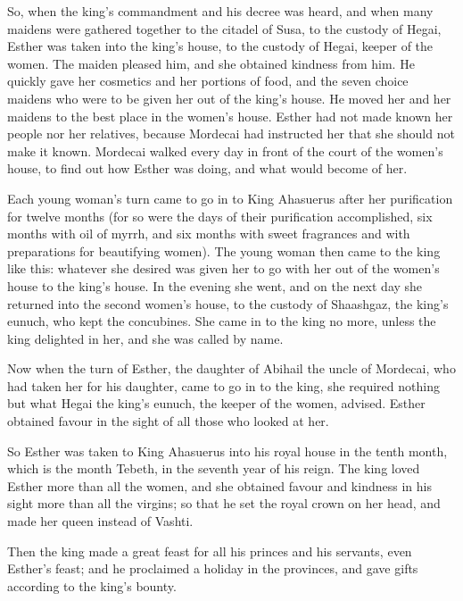 So, when the king's commandment and his decree was heard,
and when many maidens were gathered together to the citadel of Susa, to
the custody of Hegai, Esther was taken into the king's house, to the
custody of Hegai, keeper of the women.  The maiden pleased
him, and she obtained kindness from him. He quickly gave her cosmetics
and her portions of food, and the seven choice maidens who were to be
given her out of the king's house. He moved her and her maidens to the
best place in the women's house.  Esther had not made known
her people nor her relatives, because Mordecai had instructed her that
she should not make it known.  Mordecai walked every day in
front of the court of the women's house, to find out how Esther was
doing, and what would become of her.

 Each young woman's turn came to go in to King Ahasuerus
after her purification for twelve months (for so were the days of their
purification accomplished, six months with oil of myrrh, and six months
with sweet fragrances and with preparations for beautifying women).
 The young woman then came to the king like this: whatever
she desired was given her to go with her out of the women's house to the
king's house.  In the evening she went, and on the next day
she returned into the second women's house, to the custody of Shaashgaz,
the king's eunuch, who kept the concubines. She came in to the king no
more, unless the king delighted in her, and she was called by name.

 Now when the turn of Esther, the daughter of Abihail the
uncle of Mordecai, who had taken her for his daughter, came to go in to
the king, she required nothing but what Hegai the king's eunuch, the
keeper of the women, advised. Esther obtained favour in the sight of all
those who looked at her.

 So Esther was taken to King Ahasuerus into his royal house
in the tenth month, which is the month Tebeth, in the seventh year of
his reign.  The king loved Esther more than all the women,
and she obtained favour and kindness in his sight more than all the
virgins; so that he set the royal crown on her head, and made her queen
instead of Vashti.

 Then the king made a great feast for all his princes and
his servants, even Esther's feast; and he proclaimed a holiday in the
provinces, and gave gifts according to the king's bounty.

